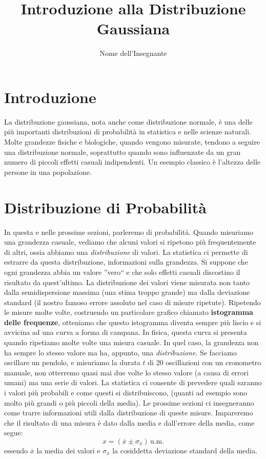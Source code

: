 \documentclass{article}
\title{Introduzione alla Distribuzione Gaussiana}
\author{Nome dell'Insegnante}
\date{}
\begin{document}
\maketitle

\section{Introduzione}
La distribuzione gaussiana, nota anche come distribuzione normale, è una delle più importanti distribuzioni di probabilità in statistica e nelle scienze naturali. Molte grandezze fisiche e biologiche, quando vengono misurate, tendono a seguire una distribuzione normale, soprattutto quando sono influenzate da un gran numero di piccoli effetti casuali indipendenti. Un esempio classico è l'altezza delle persone in una popolazione.

\section{Distribuzione di Probabilità}
In questa e nelle prossime sezioni, parleremo di probabilità. Quando misuriamo una grandezza casuale, vediamo che alcuni valori si ripetono più frequentemente di altri, ossia abbiamo una \textit{distribuzione} di valori. La statistica ci permette di estrarre da questa distribuzione, informazioni sulla grandezza. Si suppone che ogni grandezza abbia un valore ''vero`` e che solo effetti casuali discostino il risultato da quest'ultimo. La distribuzione dei valori viene misurata non tanto dalla semidispersione massima (una stima troppo grande) ma dalla deviazione standard (il nostro famoso errore assoluto nel caso di misure ripetute). Ripetendo le misure molte volte, costruendo un  particolare grafico chiamato \textbf{istogramma delle frequenze}, otteniamo che questo istogramma diventa sempre  più liscio e  si avvicina ad una curva a forma di campana. In fisica, questa curva si presenta quando ripetiamo molte volte una misura casuale. In quel caso, la grandezza non ha sempre lo stesso valore ma ha, appunto, una \textit{distribuzione}. Se facciamo oscillare un pendolo, e misuriamo la durata $t$ di 20 oscillazioni con un cronometro manuale, non otterremo quasi mai due volte lo stesso valore (a causa di errori umani) ma una serie di valori. La statistica ci consente di prevedere quali saranno i valori più probabili e come questi si distribuiscono, (quanti ad esempio sono molto più grandi o più piccoli della media). Le prossime sezioni ci insegneranno come trarre informazioni utili dalla distribuzione di queste misure. Impareremo che il risultato di una misura è dato dalla media e dall'errore della media, come segue:
\[
x=\left(\overline{x} \pm \sigma_{\overline{x}}\right) \, \text{u.m.}
\]
essendo $\overline{x}$ la media dei valori e $\sigma_{\overline{x}}$ la cosiddetta deviazione standard della media.
\end{document}
